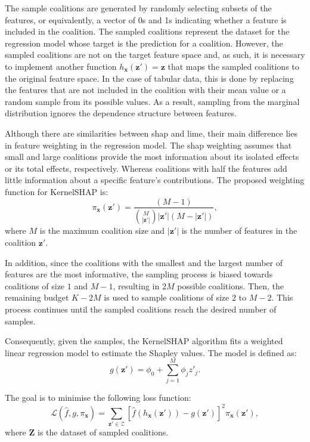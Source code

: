 The sample coalitions are generated by randomly selecting subsets of the features, or equivalently, a vector of 0s and 1s indicating whether a feature is included in the coalition. The sampled coalitions represent the dataset for the regression model whose target is the prediction for a coalition. However, the sampled coalitions are not on the target feature space and, as such, it is necessary to implement another function $h_{\mathbf{x}}\left(\mathbf{z}'\right) = \mathbf{z}$ that maps the sampled coalitions to the original feature space. In the case of tabular data, this is done by replacing the features that are not included in the coalition with their mean value or a random sample from its possible values. As a result, sampling from the marginal distribution ignores the dependence structure between features.

Although there are similarities between \acrshort{shap} and \acrshort{lime}, their main difference lies in feature weighting in the regression model. The \acrshort{shap} weighting assumes that small and large coalitions provide the most information about its isolated effects or its total effects, respectively. Whereas coalitions with half the features add little information about a specific feature's contributions. The proposed weighting function for KernelSHAP is:
\begin{equation}
    \pi_\mathbf{x} (\mathbf{z}') = \frac{(M - 1)}{\binom{M}{|\mathbf{z}'|} |\mathbf{z}'| \left(M - |\mathbf{z}'|\right)},
\end{equation}
where $M$ is the maximum coalition size and $|\mathbf{z}'|$ is the number of features in the coalition $\mathbf{z}'$.

In addition, since the coalitions with the smallest and the largest number of features are the most informative, the sampling process is biased towards coalitions of size $1$ and $M-1$, resulting in $2M$ possible coalitions. Then, the remaining budget $K - 2M$ is used to sample coalitions of size $2$ to $M-2$. This process continues until the sampled coalitions reach the desired number of samples.

Consequently, given the samples, the KernelSHAP algorithm fits a weighted linear regression model to estimate the Shapley values. The model is defined as:
\begin{equation}
    g(\mathbf{z}') = \phi_0 + \sum_{j=1}^{M} \phi_j z'_j.
\end{equation}

The goal is to minimise the following loss function:
\begin{equation}
    \mathcal{L}(\hat{f}, g, \pi_{\mathbf{x}}) = \sum_{\mathbf{z}' \in \mathcal{Z}} \left[\hat{f} \left(h_{\mathbf{x}}\left(\mathbf{z}'\right)\right) - g(\mathbf{z}')\right]^2 \pi_{\mathbf{x}}(\mathbf{z}'),
\end{equation}
where $\mathbf{Z}$ is the dataset of sampled coalitions. 

